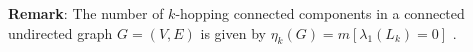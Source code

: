 \documentclass[10pt,a4paper]{article}
\begin{document}
    	    \textbf{Remark}:
    	    	The number of $k$-hopping connected components in a connected undirected graph $G=(V,E)$ is given by $\eta_k(G) = m[\lambda_1(L_k)=0]$ \citep{estrada2012path}.\\
    	    
        
%    	    	
\end{document}
